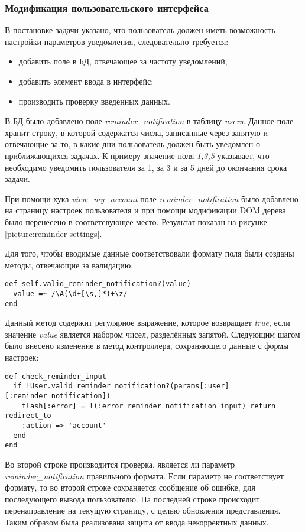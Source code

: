 \subsubsection{Модификация пользовательского интерфейса}
В постановке задачи указано, что пользователь должен иметь возможность
настройки параметров уведомления, следовательно требуется:
\begin{itemize}
  \item добавить поле в БД, отвечающее за частоту уведомлений;
  \item добавить элемент ввода в интерфейс;
  \item производить проверку введённых данных.
\end{itemize}

В БД было добавлено поле \textit{reminder\_notification} в таблицу
\textit{users}. Данное поле хранит строку, в которой содержатся числа,
записанные через запятую и отвечающие за то, в какие дни пользователь должен
быть уведомлен о приближающихся задачах. К примеру значение поля \textit{1,3,5}
указывает, что необходимо уведомить пользователя за 1, за 3 и за 5 дней до
окончания срока задачи. 

При помощи хука \textit{view\_my\_account} поле
\textit{reminder\_notification} было добавлено на страницу настроек
пользователя и при помощи модификации DOM дерева было перенесено в
соответсвующее место. Результат показан на рисунке
\ref{picture:reminder-settings}.

Для того, чтобы вводимые данные соответствовали формату поля были созданы
методы, отвечающие за валидацию:
\small{\begin{lstlisting}
def self.valid_reminder_notification?(value)
  value =~ /\A(\d+[\s,]*)+\z/
end
\end{lstlisting}}
Данный метод содержит регулярное выражение, которое возвращает \textit{true},
если значение \textit{value} является набором чисел, разделённых запятой.
Следующим шагом было внесено изменение в метод контроллера, сохраняющего данные
с формы настроек:
\small{\begin{lstlisting}
def check_reminder_input
  if !User.valid_reminder_notification?(params[:user][:reminder_notification])
    flash[:error] = l(:error_reminder_notification_input) return redirect_to
    :action => 'account'
  end
end
\end{lstlisting}}
Во второй строке производится проверка, является ли параметр
\textit{reminder\_notification} правильного формата.
Если параметр не соответствует формату, то во второй строке сохраняется
сообщение об ошибке, для последующего вывода пользователю. На последней
строке происходит перенаправление на текущую страницу, с целью обновления
представления. Таким образом была реализована защита от ввода некорректных
данных.

